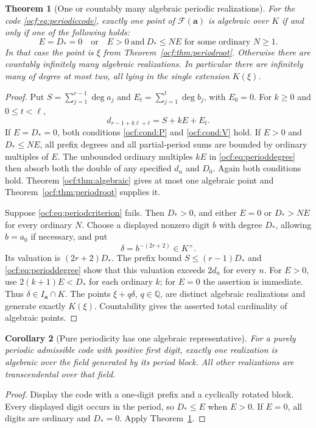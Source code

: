\documentclass[11pt,a4paper]{article}
\numberwithin{equation}{section}
\newtheorem{theorem}{Theorem}[section]
\newtheorem{corollary}[theorem]{Corollary}
\theoremstyle{definition}
\theoremstyle{remark}
\newcommand{\Q}{\mathbb Q}
\newcommand{\F}{\mathcal F}
\newcommand{\dgr}{\operatorname{deg}}
\newcommand{\codea}{\boldsymbol a}
\begin{document}
\begin{theorem}[One or countably many algebraic periodic realizations]
\label{ocf:thm:periodiccriterion}
For the code \eqref{ocf:eq:periodiccode}, exactly one point of $\F(\codea)$ is
algebraic over $K$ if and only if one of the following holds:
\begin{equation}\label{ocf:eq:periodcriterion}
 \boxed{\quad E=D_*=0\quad\text{or}\quad
 E>0\ \text{and}\ D_*\le N E
 \text{ for some ordinary }N\ge1.\quad}
\end{equation}
In that case the point is $\xi$ from Theorem~\ref{ocf:thm:periodroot}.
Otherwise there are countably infinitely many algebraic realizations.
In particular there are infinitely many of degree at most two, all lying
in the single extension $K(\xi)$.
\end{theorem}
\begin{proof}
Put $S=\sum_{j=1}^{r-1}\dgr a_j$ and
$E_t=\sum_{j=1}^{t}\dgr b_j$, with $E_0=0$. For $k\ge0$ and
$0\le t<\ell$,
\begin{equation}\label{ocf:eq:perioddegree}
 d_{r-1+k\ell+t}=S+kE+E_t.
\end{equation}
If $E=D_*=0$, both conditions \eqref{ocf:cond:P} and \eqref{ocf:cond:V} hold.
If $E>0$ and $D_*\le NE$, all prefix degrees and all partial-period sums
are bounded by ordinary multiples of $E$. The unbounded ordinary
multiples $kE$ in \eqref{ocf:eq:perioddegree} then absorb both the double of
any specified $d_n$ and $D_0$. Again both conditions hold. Theorem
\ref{ocf:thm:algebraic} gives at most one algebraic point and
Theorem~\ref{ocf:thm:periodroot} supplies it.

Suppose \eqref{ocf:eq:periodcriterion} fails. Then $D_*>0$, and either $E=0$
or $D_*>NE$ for every ordinary $N$. Choose a displayed nonzero digit $b$
with degree $D_*$, allowing $b=a_0$ if necessary, and put
\[
 \delta=b^{-(2r+2)}\in K^\times.
\]
Its valuation is $(2r+2)D_*$. The prefix bound
$S\le(r-1)D_*$ and \eqref{ocf:eq:perioddegree} show that this valuation exceeds
$2d_n$ for every $n$. For $E>0$, use
$2(k+1)E<D_*$ for each ordinary $k$; for $E=0$ the assertion is immediate.
Thus $\delta\in I_{\codea}\cap K$. The points $\xi+q\delta$, $q\in\Q$,
are distinct algebraic realizations and generate exactly $K(\xi)$.
Countability gives the asserted total cardinality of algebraic points.
\end{proof}

\begin{corollary}[Pure periodicity has one algebraic representative]
\label{ocf:cor:pureperiod}
For a purely periodic admissible code with positive first digit, exactly
one realization is algebraic over the field generated by its period
block. All other realizations are transcendental over that field.
\end{corollary}
\begin{proof}
Display the code with a one-digit prefix and a cyclically rotated block.
Every displayed digit occurs in the period, so $D_*\le E$ when $E>0$.
If $E=0$, all digits are ordinary and $D_*=0$. Apply
Theorem~\ref{ocf:thm:periodiccriterion}.
\end{proof}
\end{document}
